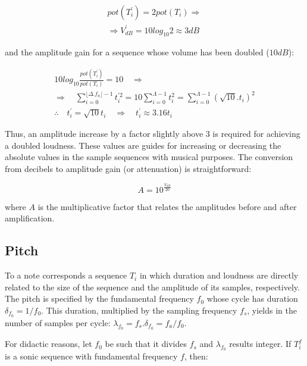 \begin{equation}\label{eq:potVol}
\begin{split}
pot(T^{'}_i)=2 pot(T_i) \Rightarrow \\ \Rightarrow V^{'}_{dB}=10log_{10} 2 \approx 3 dB
\end{split}
\end{equation}

\noindent and the amplitude gain for a sequence whose volume has been doubled ($10dB$):

\begin{equation}\label{eq:dobraVol}
\begin{split}
10log_{10}\frac{pot(T^{'}_i)}{pot(T_i)} = 10 \quad \Rightarrow \\ \Rightarrow \quad \sum_{i=0}^{\lfloor \Delta.f_a \rfloor -1}t^{'2}_i=10\sum_{i=0}^{\Lambda-1}t_i^2=\sum_{i=0}^{\Lambda-1}(\sqrt{10}.t_i)^2 \\
\therefore \quad t^{'}_i=\sqrt{10}t_i \quad \Rightarrow \quad t^{'}_i \approx 3.16t_i
\end{split}
\end{equation}

Thus, an amplitude increase by a factor slightly above 3 is required for achieving a doubled loudness. These values are guides for increasing or decreasing the absolute values in the sample sequences with musical purposes. The conversion from decibels to amplitude gain (or attenuation) is straightforward:

\begin{equation}\label{ampDec}
A = 10^{\frac{V_{dB}}{20}}
\end{equation}

\noindent where $A$ is the multiplicative factor that relates the amplitudes before and after amplification.

\subsection{Pitch}
To a note corresponds a sequence $T_i$ in which duration and loudness are directly related to the size of the sequence and the amplitude of its samples, respectively. The pitch is specified by the fundamental frequency $f_0$ whose cycle has duration $\delta_{f_0}=1/f_0$. This duration, multiplied by the sampling frequency $f_s$, yields in the number of samples per cycle: $\lambda_{f_0}=f_s . \delta_{f_0} =f_a/f_0$.

For didactic reasons, let $f_0$ be such that it divides $f_s$ and $\lambda_{f_0}$ results integer. If $T_i^f$ is a sonic sequence with fundamental frequency $f$, then:

